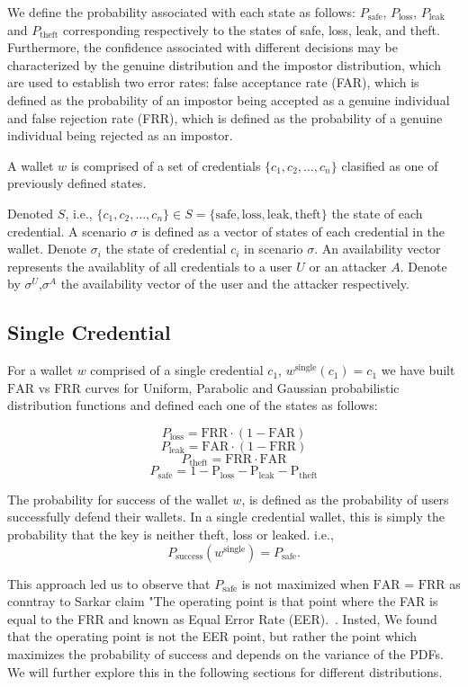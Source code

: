 \documentclass{article}
\begin{document}
We define the probability associated with each state as follows: $P_{\text{safe}}$, $P_{\text{loss}}$, $P_{\text{leak}}$ and $P_{\text{theft}}$ corresponding respectively to the states of safe, loss, leak, and theft. Furthermore, the confidence associated with different decisions may be characterized by the genuine distribution and the impostor distribution, which are used to establish two error rates: false acceptance rate (FAR), which is defined as the probability of an impostor being accepted as a genuine individual and false rejection rate (FRR), which is defined as the probability of a genuine individual being rejected as an impostor.

A wallet $w$ is comprised of a set of credentials $\{c_1, c_2, \ldots, c_n\}$ clasified as one of previously defined states.

Denoted $S$, i.e., $\{c_1, c_2, \ldots, c_n\} \in S = \{ \text{safe}, \text{loss}, \text{leak}, \text{theft} \}$ the state of each credential. A scenario $\sigma$ is defined as a vector of states of each credential in the wallet. Denote $\sigma_i$ the state of credential $c_i$ in scenario $\sigma$. An availability vector represents the availablity of all credentials to a user $U$ or an attacker $A$. Denote by $\sigma^U$,$\sigma^A$ the availability vector of the user and the attacker respectively.

\subsection{Single Credential}
For a wallet $w$ comprised of a single credential $c_1$, $w^\text{single}(c_1)=c_1$ we have built $\mathrm{FAR}$ vs $\mathrm{FRR}$ curves for Uniform, Parabolic and Gaussian probabilistic distribution functions and defined each one of the states as follows:

\[
P_{\text{loss}} = \mathrm{FRR} \cdot (1 - \mathrm{FAR})
\]
\[
P_{\text{leak}} = \mathrm{FAR} \cdot (1 - \mathrm{FRR})
\]
\[
P_{\text{theft}}=\mathrm{FRR} \cdot \mathrm{FAR}
\]
\[
P_{{\text{safe}}}=1-\mathrm{P_{\text{loss}}}-\mathrm{P_{\text{leak}}}-\mathrm{P_{\text{theft}}}
\]

The probability for success of the wallet $w$, is defined as the probability of users successfully defend their wallets. In a single credential wallet, this is simply the probability that the key is neither theft, loss or leaked. i.e.,
\[
P_{\text{success}}(w^{\text{single}}) = P_{{\text{safe}}}.
\]

This approach led us to observe that $P_{\text{safe}}$ is not maximized when $\mathrm{FAR}$ = $\mathrm{FRR}$ as conntray to Sarkar claim "The operating point is that point where the FAR is equal to the FRR and known as Equal Error Rate (EER).~\cite{sarkar2020}. Insted, We found that the operating point is not the EER point, but rather the point which maximizes the probability of success and depends on the variance of the PDFs. We will further explore this in the following sections for different distributions.
\end{document}
